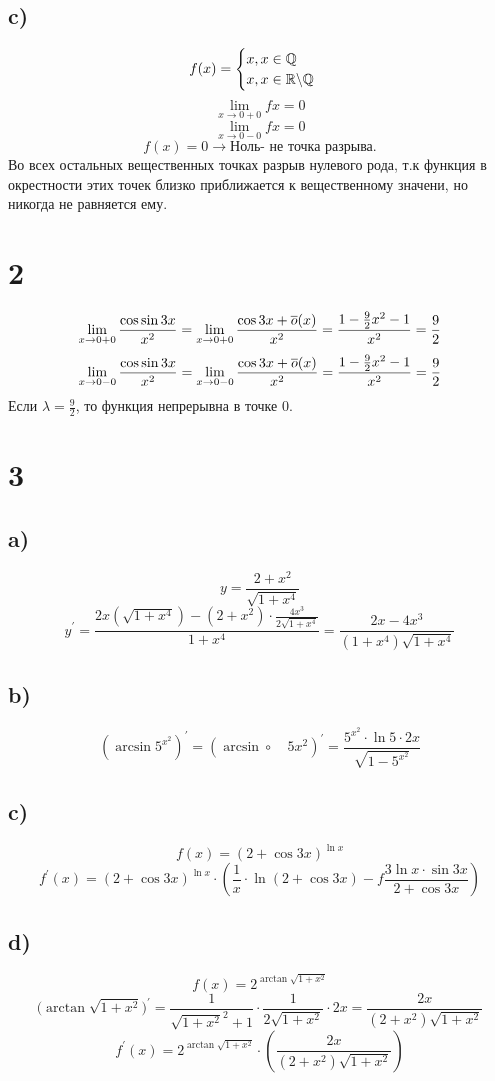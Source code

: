 	\subsection*{c)}
	$$f(x) = \begin{cases}
	x, x\in \mathbb{Q}\\ 
	x, x\in\mathbb{R}\backslash\mathbb{Q}\end{cases}$$
	$$\lim_{x\to 0+0} f{x}=0 $$
	$$\lim_{x\to 0-0} f{x}=0 $$
	$$f(x) = 0\to \text{Ноль- не точка разрыва.}$$
	Во всех остальных вещественных точках разрыв нулевого рода, т.к функция в окрестности этих точек близко приближается к вещественному значени, но никогда не равняется ему.	
	\section*{2}
	$$\lim_{x\to 0+0}\frac{\cos{\sin{3x}}}{x^2} = \lim_{x\to 0+0}\frac{\cos{3x+\overline{o}(x)}}{x^2} = \frac{1-\frac92x^2-1}{x^2} = \frac92$$
		$$\lim_{x\to 0-0}\frac{\cos{\sin{3x}}}{x^2} = \lim_{x\to 0-0}\frac{\cos{3x+\overline{o}(x)}}{x^2} = \frac{1-\frac92x^2-1}{x^2} = \frac92$$
	Если $\lambda =\frac92$, то функция непрерывна в точке 0.
	\section*{3}
	\subsection*{a)}
	$$y=\frac{2+x^2}{\sqrt{1+x^4}}$$
	$$y^{'} =\frac{2x(\sqrt{1+x^4})-(2+x^2)\cdot\frac{4x^3}{2\sqrt{1+x^4}}}{1+x^4} =\frac{2x-4x^3}{(1+x^4)\sqrt{1+x^4}}$$
	\subsection*{b)}
	$$(\arcsin{5^{x^2}})^{'} = (\arcsin\circ\quad5x^2)^{'} = \frac{5^{x^2}\cdot\ln5\cdot2x}{\sqrt{1-5^{x^2}}}$$
	\subsection*{c)}
	$$f(x) = \left(2 + \cos{3x}\right)^{\ln x}$$
	$$f^{'}(x) = (2+\cos{3x})^{\ln x}\cdot\left(\frac1x\cdot\ln(2+\cos3x)-f\frac{3\ln x\cdot\sin 3x}{2+\cos3x}\right)$$
	\subsection*{d)}
    $$f(x) = 2^{\arctan{\sqrt{1+x^2}}}$$
    $$(\arctan{\sqrt{1+x^2})^{'} = \frac{1}{\sqrt{1+x^2}^2+1}\cdot\frac{1}{2\sqrt{1+x^2}}\cdot2x} = \frac{2x}{(2+x^2)\sqrt{1+x^2}}$$
    $$f^{'}(x) =2^{\arctan{\sqrt{1+x^2}}}\cdot\left(\frac{2x}{(2+x^2)\sqrt{1+x^2}}\right) $$
